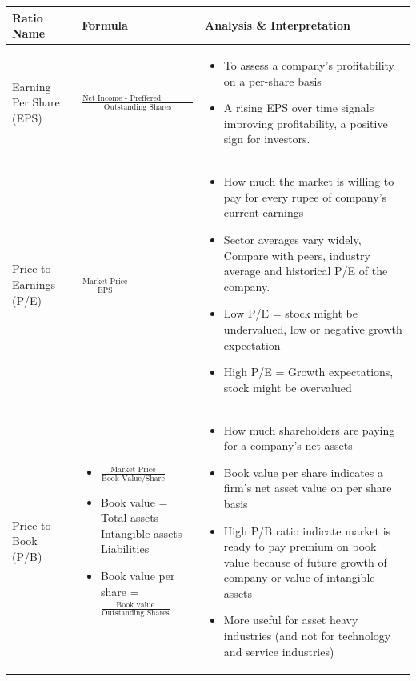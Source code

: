 \documentclass[12pt]{article}
\begin{document}
\renewcommand{\arraystretch}{1.5}
\begin{longtable}{|>{\raggedright\arraybackslash}m{4.5cm}|>{\raggedright\arraybackslash}m{5cm}|>{\raggedright\arraybackslash}m{6cm}|}
\hline
\textbf{Ratio Name} & \textbf{Formula} & \textbf{Analysis \& Interpretation} \\
\hline

Earning Per Share (EPS) & 
$\frac{\text{Net Income - Preffered Dividents}}{\text{Outstanding Shares}}$ &
\begin{itemize}
\item To assess a company's profitability on a per-share basis
\item A rising EPS over time signals improving profitability, a positive sign for investors.
\end{itemize} \\
\hline

Price-to-Earnings (P/E) & 
$\frac{\text{Market Price}}{\text{EPS}}$ &
\begin{itemize}
\item How much the market is willing to pay for every rupee of company's current earnings
\item Sector averages vary widely, Compare with peers, industry average and historical P/E of the company.
\item Low P/E = stock might be undervalued, low or negative growth expectation
\item High P/E = Growth expectations, stock might be overvalued
\end{itemize} \\
\hline

Price-to-Book (P/B) & 
\begin{itemize}
  \item $\frac{\text{Market Price}}{\text{Book Value/Share}}$
  \item Book value = Total assets - Intangible assets - Liabilities
  \item Book value per share = $\frac{\text{Book value}}{\text{Outstanding Shares}}$
\end{itemize} &
\begin{itemize}
\item How much shareholders are paying for a company's net assets
\item Book value per share indicates a firm's net asset value on per share basis
\item High P/B ratio indicate market is ready to pay premium on book value because of future growth of company or value of intangible assets
\item More useful for asset heavy industries (and not for technology and service industries)
\end{itemize} \\
\hline


\end{longtable}
\end{document}
